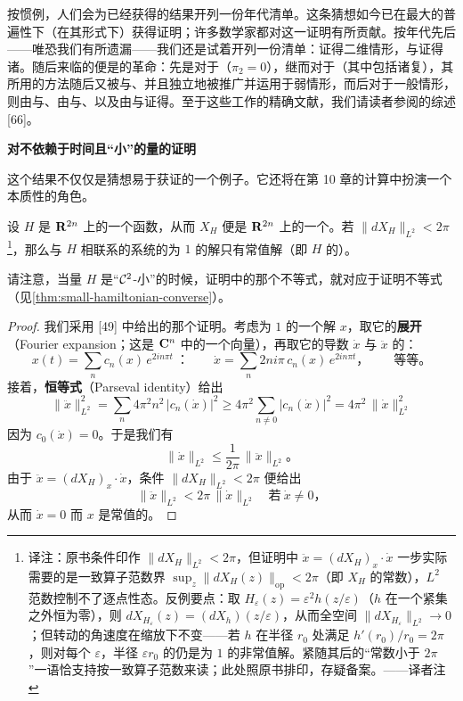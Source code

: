 按惯例，人们会为已经获得的结果开列一份年代清单。这条猜想如今已在最大的普遍性下（在其\trHomology{}形式下）获得证明；许多数学家都对这一证明有所贡献。按年代先后——唯恐我们有所遗漏——我们还是试着开列一份清单：\trEliashberg{}证得二维情形，\trConley{}与\trZehnder{}证得诸\trTorus。随后来临的便是\trFloer{}的革命：先是对于\trAsphericity\trManifold（$\pi_2=0$），继而对于\trMonotone\trManifold（其中包括诸复\trProjectiveSpace），其所用的方法随后又被\trHofer{}与\trSalamon、并且独立地被\trOno{}推广并运用于弱\trMonotone{}情形，而后对于一般情形，则由\trFukaya{}与\trOno、由\trLiu{}与\trTian、以及由\trHofer{}与\trSalamon{}证得。至于这些工作的精确文献，我们请读者参阅\trSalamon{}的综述 [66]。

\textbf{对不依赖于时间且“小”的\trHamiltonian{}量的证明}

这个结果不仅仅是猜想易于获证的一个例子。它还将在第 10 章的\trFloerHomology{}计算中扮演一个本质性的角色。

\begin{proposition}\label{thm:small-hamiltonian-periodic-solutions}
设 $H$ 是 $\mathbf{R}^{2n}$ 上的一个函数，从而 $X_H$ 便是 $\mathbf{R}^{2n}$ 上的一个\trVectorField。若 $\|dX_H\|_{L^2}<2\pi$\footnote{译注：原书条件印作 $\|dX_H\|_{L^2}<2\pi$，但证明中 $\ddot{x}=(dX_H)_x\cdot\dot{x}$ 一步实际需要的是一致算子范数界 $\sup_z\|dX_H(z)\|_{\mathrm{op}}<2\pi$（即 $X_H$ 的\trLipschitz{}常数），$L^2$ 范数控制不了逐点性态。反例要点：取 $H_\varepsilon(z)=\varepsilon^2h(z/\varepsilon)$（$h$ 在一个紧集之外恒为零），则 $dX_{H_\varepsilon}(z)=(dX_h)(z/\varepsilon)$，从而全空间 $\|dX_{H_\varepsilon}\|_{L^2}\to 0$；但转动的角速度在缩放下不变——若 $h$ 在半径 $r_0$ 处满足 $h'(r_0)/r_0=2\pi$，则对每个 $\varepsilon$，半径 $\varepsilon r_0$ 的\trCircle{}仍是\trPeriodic{}为 $1$ 的非常值解。紧随其后的“\trLipschitz{}常数小于 $2\pi$”一语恰支持按一致算子范数来读；此处照原书排印，存疑备案。——译者注}，那么与 $H$ 相联系的\trHamiltonian{}系统的\trPeriodic{}为 $1$ 的解只有常值解（即 $H$ 的\trCriticalPoint）。
\end{proposition}

请注意，当\trHamiltonian{}量 $H$ 是“$\mathcal{C}^2$-小”的时候，证明\trArnoldConjecture{}中的那个不等式，就对应于证明\trMorse{}不等式（见\cref{thm:small-hamiltonian-converse}）。

\begin{proof}
我们采用 [49] 中给出的那个证明。考虑\trPeriodic{}为 $1$ 的一个解 $x$，取它的\textbf{\trFourier{}展开}（Fourier expansion；这是 $\mathbf{C}^n$ 中的一个向量），再取它的导数 $\dot{x}$ 与 $\ddot{x}$ 的：
\[
x(t)=\sum_n c_n(x)\,e^{2in\pi t}\ \text{：}\qquad \dot{x}=\sum_n 2ni\pi\,c_n(x)\,e^{2in\pi t}\text{，}\qquad\text{等等。}
\]
接着，\textbf{\trParseval{}恒等式}（Parseval identity）给出
\[
\|\ddot{x}\|_{L^2}^2=\sum_n 4\pi^2n^2\,|c_n(\dot{x})|^2\ge 4\pi^2\sum_{n\neq 0}|c_n(\dot{x})|^2=4\pi^2\,\|\dot{x}\|_{L^2}^2
\]
因为 $c_0(\dot{x})=0$。于是我们有
\[
\|\dot{x}\|_{L^2}\le\frac{1}{2\pi}\,\|\ddot{x}\|_{L^2}\text{。}
\]
由于 $\ddot{x}=(dX_H)_x\cdot\dot{x}$，条件 $\|dX_H\|_{L^2}<2\pi$ 便给出
\[
\|\ddot{x}\|_{L^2}<2\pi\,\|\dot{x}\|_{L^2}\quad\text{若}\ \dot{x}\neq 0\text{，}
\]
从而 $\dot{x}=0$ 而 $x$ 是常值的。
\end{proof}

